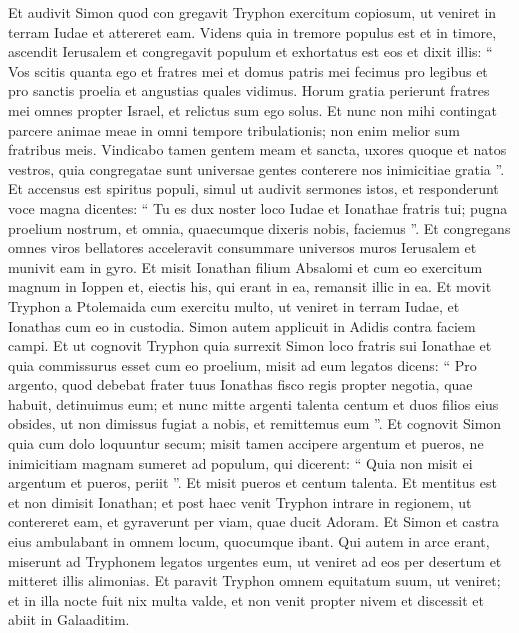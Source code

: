 \begin{biblechapter}
\begin{biblechapter}
\begin{biblechapter}
\begin{biblechapter}
\begin{biblechapter}
\begin{biblechapter}
\begin{biblechapter}
\begin{biblechapter}
\begin{biblechapter}
\begin{biblechapter}
\begin{biblechapter}
\begin{biblechapter}
\begin{biblechapter}
\verse Et audivit Simon quod con gregavit Tryphon exercitum copiosum, ut veniret in terram Iudae et attereret eam. 
\verse Videns quia in tremore populus est et in timore, ascendit Ierusalem et congregavit populum 
\verse et exhortatus est eos et dixit illis: “ Vos scitis quanta ego et fratres mei et domus patris mei fecimus pro legibus et pro sanctis proelia et angustias quales vidimus. 
\verse Horum gratia perierunt fratres mei omnes propter Israel, et relictus sum ego solus. 
 \verse Et nunc non mihi contingat parcere animae meae in omni tempore tribulationis; non enim melior sum fratribus meis. 
\verse Vindicabo tamen gentem meam et sancta, uxores quoque et natos vestros, quia congregatae sunt universae gentes conterere nos inimicitiae gratia ”. 
\verse Et accensus est spiritus populi, simul ut audivit sermones istos, 
\verse et responderunt voce magna dicentes: “ Tu es dux noster loco Iudae et Ionathae fratris tui; 
\verse pugna proelium nostrum, et omnia, quaecumque dixeris nobis, faciemus ”. 
\verse Et congregans omnes viros bellatores acceleravit consummare universos muros Ierusalem et munivit eam in gyro. 
\verse Et misit Ionathan filium Absalomi et cum eo exercitum magnum in Ioppen et, eiectis his, qui erant in ea, remansit illic in ea.
 \verse Et movit Tryphon a Ptolemaida cum exercitu multo, ut veniret in terram Iudae, et Ionathas cum eo in custodia. 
\verse Simon autem applicuit in Adidis contra faciem campi. 
\verse Et ut cognovit Tryphon quia surrexit Simon loco fratris sui Ionathae et quia commissurus esset cum eo proelium, misit ad eum legatos 
\verse dicens: “ Pro argento, quod debebat frater tuus Ionathas fisco regis propter negotia, quae habuit, detinuimus eum; 
\verse et nunc mitte argenti talenta centum et duos filios eius obsides, ut non dimissus fugiat a nobis, et remittemus eum ”. 
\verse Et cognovit Simon quia cum dolo loquuntur secum; misit tamen accipere argentum et pueros, ne inimicitiam magnam sumeret ad populum, 
 \verse qui dicerent: “ Quia non misit ei argentum et pueros, periit ”. 
\verse Et misit pueros et centum talenta. Et mentitus est et non dimisit Ionathan; 
\verse et post haec venit Tryphon intrare in regionem, ut contereret eam, et gyraverunt per viam, quae ducit Adoram. Et Simon et castra eius ambulabant in omnem locum, quocumque ibant. 
\verse Qui autem in arce erant, miserunt ad Tryphonem legatos urgentes eum, ut veniret ad eos per desertum et mitteret illis alimonias. 
\verse Et paravit Tryphon omnem equitatum suum, ut veniret; et in illa nocte fuit nix multa valde, et non venit propter nivem et discessit et abiit in Galaaditim.

\end{biblechapter}
\end{biblechapter}
\end{biblechapter}
\end{biblechapter}
\end{biblechapter}
\end{biblechapter}
\end{biblechapter}
\end{biblechapter}
\end{biblechapter}
\end{biblechapter}
\end{biblechapter}
\end{biblechapter}
\end{biblechapter}
